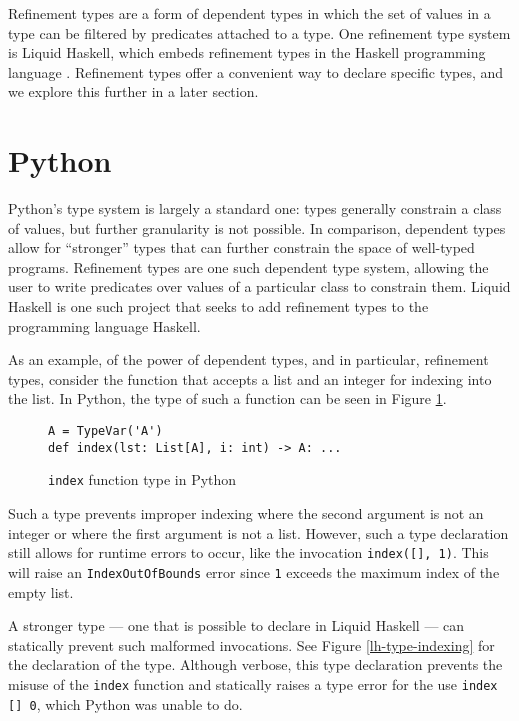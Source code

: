 \documentclass{book}
\begin{document}
Refinement types are a form of dependent types in which the set of values in a type can be filtered by predicates attached to a type. One refinement type system is Liquid Haskell, which embeds refinement types in the Haskell programming language \cite{Jhala2014RefinementTF}. Refinement types offer a convenient way to declare specific types, and we explore this further in a later section.

\section{Python}

Python's type system is largely a standard one: types generally constrain a class of values, but further granularity is not possible. In comparison, dependent types allow for ``stronger'' types that can further constrain the space of well-typed programs. Refinement types are one such dependent type system, allowing the user to write predicates over values of a particular class to constrain them. Liquid Haskell is one such project that seeks to add refinement types to the programming language Haskell.

As an example, of the power of dependent types, and in particular, refinement types, consider the function that accepts a list and an integer for indexing into the list. In Python, the type of such a function can be seen in Figure \ref{python-type-indexing}.

\begin{figure}
\centering
\begin{verbatim}
A = TypeVar('A')
def index(lst: List[A], i: int) -> A: ... \end{verbatim}
\caption{\texttt{index} function type in Python}
\label{python-type-indexing}
\end{figure}
Such a type prevents improper indexing where the second argument is not an integer or where the first argument is not a list. However, such a type declaration still allows for runtime errors to occur, like the invocation \texttt{index([], 1)}. This will raise an \texttt{IndexOutOfBounds} error since \texttt{1} exceeds the maximum index of the empty list.

A stronger type --- one that is possible to declare in Liquid Haskell --- can statically prevent such malformed invocations. See Figure \ref{lh-type-indexing} for the declaration of the type. Although verbose, this type declaration prevents the misuse of the \texttt{index} function and statically raises a type error for the use \texttt{index [] 0}, which Python was unable to do.
\end{document}
